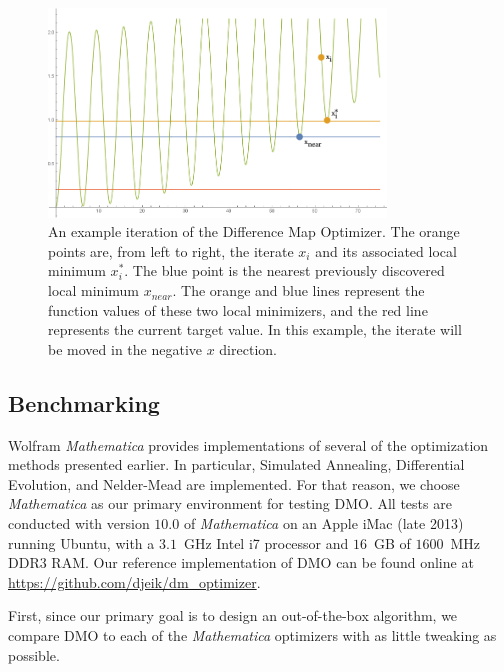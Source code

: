 \documentclass[12pt]{article}
\begin{document}
\begin{figure}[H]
    \begin{center}
        \includegraphics[width=0.8\textwidth]{../figures/iteratingnew.png}
        \caption{An example iteration of the Difference Map Optimizer.
            The orange points are, from left to right, the iterate $x_i$
            and its associated local minimum $x_i^*$. The blue point is the
            nearest previously discovered local minimum $x_{near}$.
            The orange and blue lines represent the function values of
            these two local minimizers, and the red line represents the
            current target value. In this example, the iterate will be
            moved in the negative $x$ direction.}
        \label{fig:iteration}
    \end{center}
\end{figure}


\subsection{Benchmarking}

Wolfram \emph{Mathematica} provides implementations of several of the
optimization methods presented earlier.
In particular, Simulated Annealing, Differential Evolution, and Nelder-Mead
are implemented.
For that reason, we choose \emph{Mathematica} as our primary environment for
testing DMO.
All tests are conducted with version $10.0$ of \emph{Mathematica} on an
Apple iMac (late 2013) running Ubuntu, with a $3.1$~GHz Intel i7 processor
and $16$~GB of $1600$~MHz DDR3 RAM.
Our reference implementation of DMO can be found online at
\url{https://github.com/djeik/dm_optimizer}.

First, since our primary goal is to design an out-of-the-box algorithm,
we compare DMO to each of the \emph{Mathematica} optimizers with as little
tweaking as possible.
\end{document}
